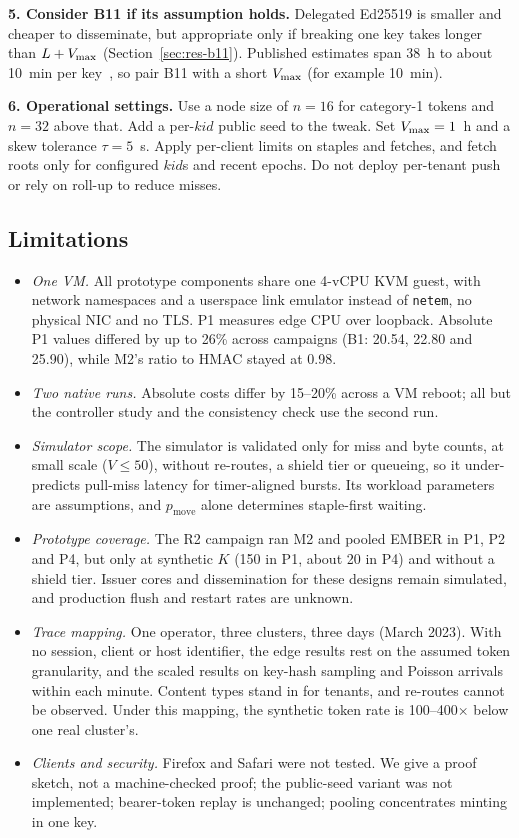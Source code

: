 \textbf{5. Consider B11 if its assumption holds.} Delegated Ed25519 is smaller and cheaper to disseminate, but appropriate only if breaking one key takes longer than $L+V_{\max}$ (Section~\ref{sec:res-b11}). Published estimates span 38~h to about 10~min per key~\cite{litinski2023ecc}, so pair B11 with a short $V_{\max}$ (for example 10~min).

\textbf{6. Operational settings.} Use a node size of $n=16$ for category-1 tokens and $n=32$ above that. Add a per-$\mathit{kid}$ public seed to the tweak. Set $V_{\max}=1$~h and a skew tolerance $\tau=5$~s. Apply per-client limits on staples and fetches, and fetch roots only for configured $\mathit{kid}$s and recent epochs. Do not deploy per-tenant push or rely on roll-up to reduce misses.

\subsection{Limitations}
\label{sec:limits}
\begin{itemize}
\item \emph{One VM.} All prototype components share one 4-vCPU KVM guest, with network namespaces and a userspace link emulator instead of \texttt{netem}, no physical NIC and no TLS. P1 measures edge CPU over loopback. Absolute P1 values differed by up to 26\% across campaigns (B1: 20.54, 22.80 and 25.90\us), while M2's ratio to HMAC stayed at 0.98.
\item \emph{Two native runs.} Absolute costs differ by 15--20\% across a VM reboot; all but the controller study and the consistency check use the second run.
\item \emph{Simulator scope.} The simulator is validated only for miss and byte counts, at small scale ($V\le50$), without re-routes, a shield tier or queueing, so it under-predicts pull-miss latency for timer-aligned bursts. Its workload parameters are assumptions, and $p_{\text{move}}$ alone determines staple-first waiting.
\item \emph{Prototype coverage.} The R2 campaign ran M2 and pooled EMBER in P1, P2 and P4, but only at synthetic $K$ (150 in P1, about 20 in P4) and without a shield tier. Issuer cores and dissemination for these designs remain simulated, and production flush and restart rates are unknown.
\item \emph{Trace mapping.} One operator, three clusters, three days (March 2023). With no session, client or host identifier, the edge results rest on the assumed token granularity, and the scaled results on key-hash sampling and Poisson arrivals within each minute. Content types stand in for tenants, and re-routes cannot be observed. Under this mapping, the synthetic token rate is 100--400$\times$ below one real cluster's.
\item \emph{Clients and security.} Firefox and Safari were not tested. We give a proof sketch, not a machine-checked proof; the public-seed variant was not implemented; bearer-token replay is unchanged; pooling concentrates minting in one key.
\end{itemize}
